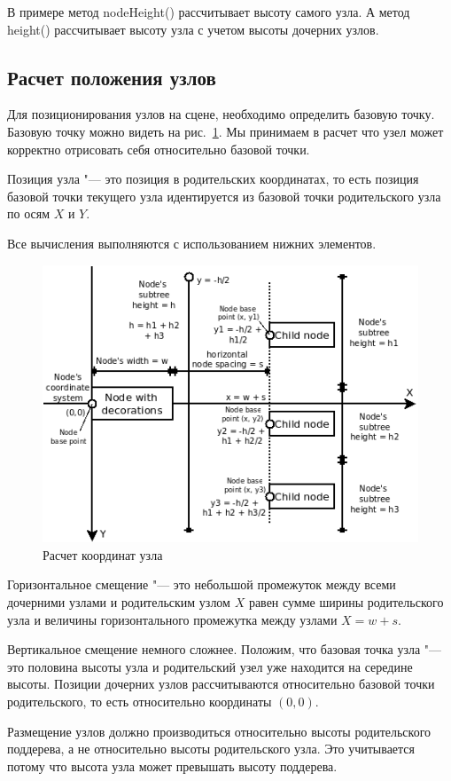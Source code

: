 В примере метод nodeHeight() рассчитывает высоту самого узла. А метод height() рассчитывает высоту узла с учетом высоты дочерних узлов.

\subsection{Расчет положения узлов}

Для позиционирования узлов на сцене, необходимо определить базовую точку. Базовую точку можно видеть на рис.~\ref{ris:node_calculation}. Мы принимаем в расчет что узел может корректно отрисовать себя относительно базовой точки.

Позиция узла "--- это позиция в родительских координатах, то есть позиция базовой точки текущего узла идентируется из базовой точки родительского узла по осям $X$ и $Y$.

Все вычисления выполняются с использованием нижних элементов.
\begin{figure}[h!]
\centering
\includegraphics[width=0.8\linewidth]{node-calculation}
\caption{Расчет координат узла}
\label{ris:node_calculation}
\end{figure}

Горизонтальное смещение "--- это небольшой промежуток между всеми дочерними узлами и родительским узлом
$X$ равен сумме ширины родительского узла и величины горизонтального промежутка между узлами $X = w + s$.

Вертикальное смещение немного сложнее. Положим, что базовая точка узла "--- это половина высоты узла и родительский узел уже находится на середине высоты. Позиции дочерних узлов рассчитываются относительно базовой точки родительского, то есть относительно координаты $(0, 0)$.

Размещение узлов должно производиться относительно высоты родительского поддерева, а не относительно высоты родительского узла. Это учитывается потому что высота узла может превышать высоту поддерева.

